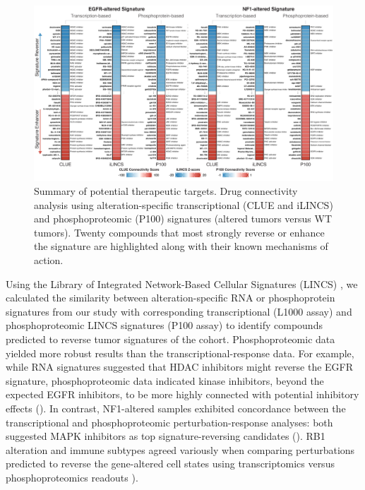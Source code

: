 \begin{figure}[tb]
    \centering
    \includegraphics[width=\linewidth]{figures/chap04_cptac_gbm_discov/figure7c_drug_connectivity_signature.pdf}
    \caption[Summary of potential therapeutic targets.]{%
        Summary of potential therapeutic targets. Drug connectivity analysis using alteration-specific transcriptional (CLUE and iLINCS) and phosphoproteomic (P100) signatures (altered tumors versus WT tumors). Twenty compounds that most strongly reverse or enhance the signature are highlighted along with their known mechanisms of action.
    }
    \label{fig:gbm-druggability}
\end{figure}

Using the Library of Integrated Network-Based Cellular Signatures (LINCS) \cite{keenanab_pillaia:LibraryIntegrated2018,stathiasv_schurersc:LINCSData2019}, we calculated the similarity between alteration-specific RNA or phosphoprotein signatures from our study with corresponding transcriptional (L1000 assay) \cite{subramaniana_golubtr:NextGeneration2017} and phosphoproteomic LINCS signatures (P100 assay) \cite{litichevskiyl_jaffejd:LibraryPhosphoproteomic2018} to identify compounds predicted to reverse tumor signatures of the cohort. Phosphoproteomic data yielded more robust results than the transcriptional-response data. For example, while RNA signatures suggested that HDAC inhibitors might reverse the EGFR signature, phosphoproteomic data indicated kinase inhibitors, beyond the expected EGFR inhibitors, to be more highly connected with potential inhibitory effects (). In contrast, NF1-altered samples exhibited concordance between the transcriptional and phosphoproteomic perturbation-response analyses: both suggested MAPK inhibitors as top signature-reversing candidates (). RB1 alteration and immune subtypes agreed variously when comparing perturbations predicted to reverse the gene-altered cell states using transcriptomics versus phosphoproteomics readouts ).

